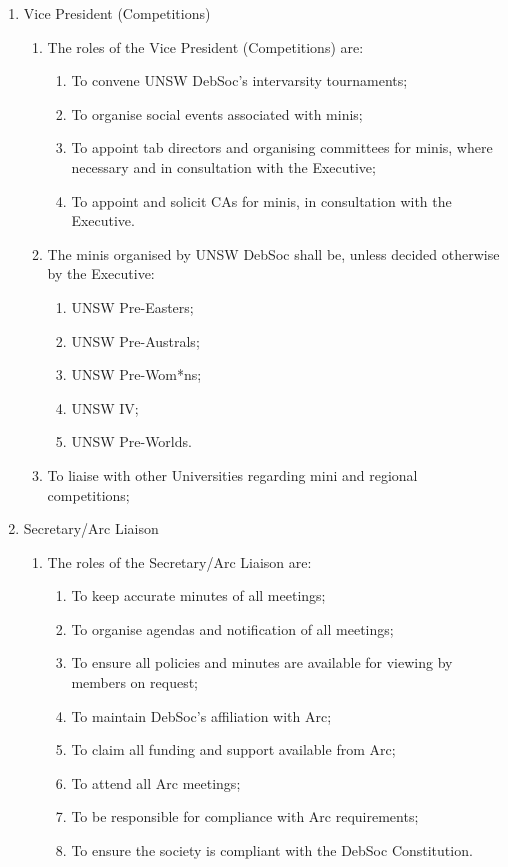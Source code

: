 \begin{enumerate}
\item Vice President (Competitions)
  \begin{enumerate}
  \item The roles of the Vice President (Competitions) are:
    \begin{enumerate}
    \item To convene UNSW DebSoc’s intervarsity tournaments;
    \item To organise social events associated with minis;
    \item To appoint tab directors and organising committees for minis, where necessary and in consultation with the Executive;
    \item To appoint and solicit CAs for minis, in consultation with the Executive.
    \end{enumerate}
  \item The minis organised by UNSW DebSoc shall be, unless decided otherwise by the Executive:
    \begin{enumerate}
    \item UNSW Pre-Easters;
    \item UNSW Pre-Australs;
    \item UNSW Pre-Wom*ns;
    \item UNSW IV;
    \item UNSW Pre-Worlds.
    \end{enumerate}
  \item To liaise with other Universities regarding mini and regional competitions;
  \end{enumerate}

\item Secretary/Arc Liaison
  \begin{enumerate}
  \item The roles of the Secretary/Arc Liaison are:
    \begin{enumerate}
    \item To keep accurate minutes of all meetings;
    \item To organise agendas and notification of all meetings;
    \item To ensure all policies and minutes are available for viewing by members on request;
    \item To maintain DebSoc’s affiliation with Arc;
    \item To claim all funding and support available from Arc;
    \item To attend all Arc meetings;
    \item To be responsible for compliance with Arc requirements;
    \item To ensure the society is compliant with the DebSoc Constitution.
    \end{enumerate}
  \end{enumerate}


\end{enumerate}
